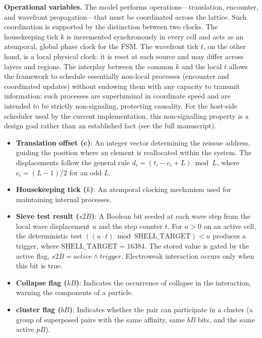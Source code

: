 \documentclass{ijuc}
\begin{document}
\medskip\noindent\textbf{Operational variables.}
The model performs operations---translation, encounter, and wavefront propagation---that must be coordinated across the lattice. Such coordination is supported by the distinction between two clocks. The housekeeping tick $k$ is incremented synchronously in every cell and acts as an atemporal, global phase clock for the FSM. The wavefront tick $t$, on the other hand, is a local physical clock: it is reset at each source and may differ across layers and regions. The interplay between the common $k$ and the local $t$ allows the framework to schedule essentially non-local processes (encounter and coordinated updates) without endowing them with any capacity to transmit information: such processes are superluminal in coordinate speed and are intended to be strictly non-signaling, protecting causality.  For the host-side scheduler used by the current implementation, this non-signalling property is a design goal rather than an established fact (see the full manuscript).

\begin{itemize}
\item \textbf{Translation offset ($\mathbf{c}$)}: An integer vector determining the reissue address, guiding the position where an element is reallocated within the system. The displacements follow the general rule $d_i = (t_i - c_i + L) \bmod L$, where $c_i = (L-1)/2$ for an odd $L$.
\item \textbf{Housekeeping tick ($k$)}: An atemporal clocking mechanism used for maintaining internal processes.
\item \textbf{Sieve test result ($s2B$)}: A Boolean bit seeded at each wave step from the local wave displacement $u$ and the step counter $t$. For $u > 0$ on an active cell, the deterministic test $((u \cdot t) \bmod \mathrm{SHELL\_TARGET}) < u$ produces a trigger, where $\mathrm{SHELL\_TARGET} = 16384$. The stored value is gated by the active flag, $s2B = \mathit{active} \land \mathit{trigger}$. Electroweak interaction occurs only when this bit is true.
\item \textbf{Collapse flag ($kB$)}: Indicates the occurrence of collapse in the interaction, warning the components of a particle.
\item \textbf{cluster flag ($bB$)}: Indicates whether the pair can participate in a cluster (a group of superposed pairs with the same affinity, same $bB$ bits, and the same active $pB$).
\end{itemize}
\end{document}
